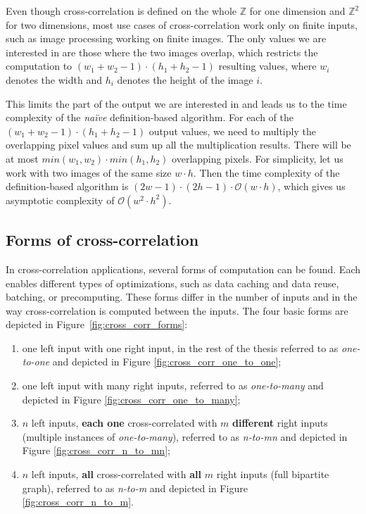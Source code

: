 Even though cross-correlation is defined on the whole $\mathbb{Z}$ for one dimension and $\mathbb{Z}^2$ for two dimensions, most use cases of cross-correlation work only on finite inputs, such as image processing working on finite images. The only values we are interested in are those where the two images overlap, which restricts the computation to $(w_1 + w_2 - 1) \cdot (h_1 + h_2 - 1)$ resulting values, where $w_i$ denotes the width and $h_i$ denotes the height of the image $i$.

This limits the part of the output we are interested in and leads us to the time complexity of the \textit{na\"{i}ve} definition-based algorithm. For each of the $(w_1 + w_2 - 1) \cdot (h_1 + h_2 - 1)$ output values, we need to multiply the overlapping pixel values and sum up all the multiplication results. There will be at most $min(w_1, w_2) \cdot min(h_1, h_2)$ overlapping pixels. For simplicity, let us work with two images of the same size $w \cdot h$. Then the time complexity of the definition-based algorithm is $(2w-1) \cdot (2h - 1) \cdot \mathcal{O}(w \cdot h)$, which gives us asymptotic complexity of $\mathcal{O}(w^2 \cdot h^2)$.


\subsection{Forms of cross-correlation}\label{sec:cross_corr_forms}

In cross-correlation applications, several forms of computation can be found. Each enables different types of optimizations, such as data caching and data reuse, batching, or precomputing. These forms differ in the number of inputs and in the way cross-correlation is computed between the inputs. The four basic forms are depicted in Figure~\ref{fig:cross_corr_forms}:

\begin{enumerate}
	\item one left input with one right input, in the rest of the thesis referred to as \textit{one-to-one} and depicted in Figure \ref{fig:cross_corr_one_to_one};
	\item one left input with many right inputs, referred to as \textit{one-to-many} and depicted in Figure \ref{fig:cross_corr_one_to_many};
	\item $n$ left inputs, \textbf{each one} cross-correlated with $m$ \textbf{different} right inputs (multiple instances of \textit{one-to-many}), referred to as \textit{n-to-mn} and depicted in Figure \ref{fig:cross_corr_n_to_mn};
	\item $n$ left inputs, \textbf{all} cross-correlated with \textbf{all} $m$ right inputs (full bipartite graph), referred to as \textit{n-to-m} and depicted in Figure \ref{fig:cross_corr_n_to_m}.
\end{enumerate} 


